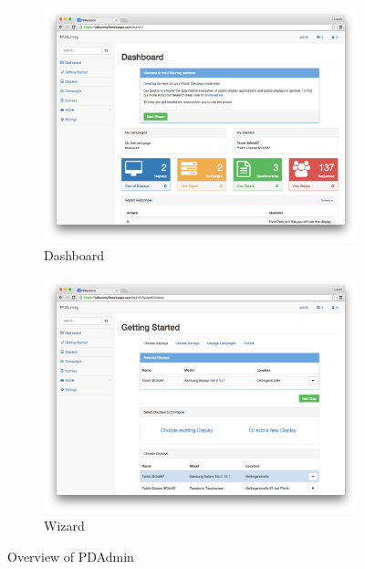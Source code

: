 		\begin{figure}
		    \centering
		    \begin{subfigure}[b]{0.7\textwidth}
		        \centering
		        \includegraphics[width=\textwidth]{img/screenshots/pdadmin/dashboard}
		        \caption{Dashboard}
				\label{fig:pdadmin-dashobard}
		    \end{subfigure}
		    \hfill
		    \begin{subfigure}[b]{0.7\textwidth}
		        \centering
		        \includegraphics[width=\textwidth]{img/screenshots/pdadmin/wizard-display_selected.png}
		        \caption{Wizard}
		        \label{fig:pdadmin-wizard}
		    \end{subfigure}
		    \caption{Overview of PDAdmin}
		\end{figure}
		


